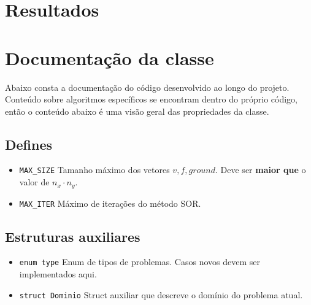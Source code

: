 \documentclass[oneside]{abntex2}
\begin{document}
\section{Resultados}
\section{Documentação da classe} \label{sec_doc}
Abaixo consta a documentação do código desenvolvido ao longo do projeto. Conteúdo sobre algoritmos específicos se encontram dentro do próprio código, então o conteúdo abaixo é uma visão geral das propriedades da classe.
\subsection{Defines}
\begin{itemize}
    \item \texttt{MAX\_SIZE} \newline
        Tamanho máximo dos vetores $v, f, ground$. Deve ser \textbf{maior que} o valor de $n_x \cdot n_y$.
    \item \texttt{MAX\_ITER} \newline
        Máximo de iterações do método SOR.
\end{itemize}
\subsection{Estruturas auxiliares}
\begin{itemize}
    \item \texttt{enum type} \newline
        Enum de tipos de problemas. Casos novos devem ser implementados aqui.
    \item \texttt{struct Dominio} \newline
        Struct auxiliar que descreve o domínio do problema atual.
\end{itemize}
\end{document}
